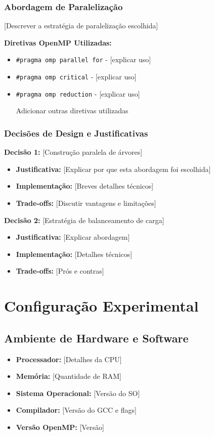 \documentclass[a4paper,11pt]{article}
\begin{document}
\subsubsection{Abordagem de Paralelização}
[Descrever a estratégia de paralelização escolhida]

\textbf{Diretivas OpenMP Utilizadas:}
\begin{itemize}
    \item \texttt{\#pragma omp parallel for} - [explicar uso]
    \item \texttt{\#pragma omp critical} - [explicar uso]
    \item \texttt{\#pragma omp reduction} - [explicar uso]
    \item [Adicionar outras diretivas utilizadas]
\end{itemize}

\subsubsection{Decisões de Design e Justificativas}

\textbf{Decisão 1:} [Construção paralela de árvores]
\begin{itemize}
    \item \textbf{Justificativa:} [Explicar por que esta abordagem foi escolhida]
    \item \textbf{Implementação:} [Breves detalhes técnicos]
    \item \textbf{Trade-offs:} [Discutir vantagens e limitações]
\end{itemize}

\textbf{Decisão 2:} [Estratégia de balanceamento de carga]
\begin{itemize}
    \item \textbf{Justificativa:} [Explicar abordagem]
    \item \textbf{Implementação:} [Detalhes técnicos]
    \item \textbf{Trade-offs:} [Prós e contras]
\end{itemize}

\section{Configuração Experimental}

\subsection{Ambiente de Hardware e Software}
\begin{itemize}
    \item \textbf{Processador:} [Detalhes da CPU]
    \item \textbf{Memória:} [Quantidade de RAM]
    \item \textbf{Sistema Operacional:} [Versão do SO]
    \item \textbf{Compilador:} [Versão do GCC e flags]
    \item \textbf{Versão OpenMP:} [Versão]
\end{itemize}
\end{document}
